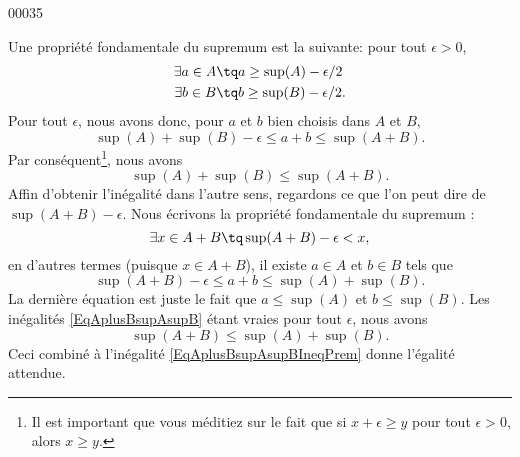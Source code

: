 
\begin{corrige}{00035}

Une propriété fondamentale du supremum est la suivante: pour tout $\epsilon>0$, 
\begin{equation}
	\begin{aligned}[]
		\exists a\in A&\tq a\geq \sup(A)-\epsilon/2\\
		\exists b\in B&\tq b\geq \sup(B)-\epsilon/2.
	\end{aligned}
\end{equation}
Pour tout $\epsilon$, nous avons donc, pour $a$ et $b$ bien choisis dans $A$ et $B$,
\begin{equation}
	\sup(A)+\sup(B)-\epsilon\leq a+b\leq\sup(A+B).
\end{equation}
Par conséquent\footnote{Il est important que vous méditiez sur le fait que si $x+\epsilon\geq y$ pour tout $\epsilon>0$, alors $x\geq y$.}, nous avons
\begin{equation}		\label{EqAplusBsupAsupBIneqPrem}	
	\sup(A)+\sup(B)\leq\sup(A+B).
\end{equation}
Affin d'obtenir l'inégalité dans l'autre sens, regardons ce que l'on peut dire de $\sup(A+B)-\epsilon$. Nous écrivons la propriété fondamentale du supremum :
\begin{equation}
	\exists x\in A+B\tq \sup(A+B)-\epsilon<x,
\end{equation}
en d'autres termes (puisque $x\in A+B$), il existe $a\in A$ et $b\in B$ tels que
\begin{equation}		\label{EqAplusBsupAsupB}
	\sup(A+B)-\epsilon\leq a+b\leq\sup(A)+\sup(B).
\end{equation}
La dernière équation est juste le fait que $a\leq\sup(A)$ et $b\leq\sup(B)$. Les inégalités \eqref{EqAplusBsupAsupB} étant vraies pour tout $\epsilon$, nous avons
\begin{equation}
	\sup(A+B)\leq\sup(A)+\sup(B).
\end{equation}
Ceci combiné à l'inégalité \eqref{EqAplusBsupAsupBIneqPrem} donne l'égalité attendue.

\end{corrige}
